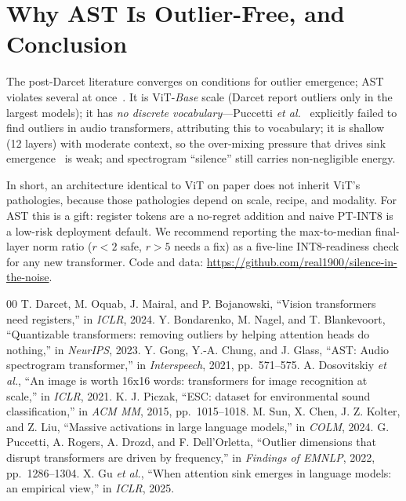 \documentclass[conference]{IEEEtran}
\begin{document}
\section{Why AST Is Outlier-Free, and Conclusion}
The post-Darcet literature converges on conditions for outlier emergence; AST violates several at once~\cite{darcet2024need,sun2024massive,puccetti2022outlier,gu2025emergence}. It is ViT-\emph{Base} scale (Darcet report outliers only in the largest models); it has \emph{no discrete vocabulary}---Puccetti \emph{et al.}~\cite{puccetti2022outlier} explicitly failed to find outliers in audio transformers, attributing this to vocabulary; it is shallow (12 layers) with moderate context, so the over-mixing pressure that drives sink emergence~\cite{gu2025emergence} is weak; and spectrogram ``silence'' still carries non-negligible energy.

In short, an architecture identical to ViT on paper does not inherit ViT's pathologies, because those pathologies depend on scale, recipe, and modality. For AST this is a gift: register tokens are a no-regret addition and naive PT-INT8 is a low-risk deployment default. We recommend reporting the max-to-median final-layer norm ratio ($r{<}2$ safe, $r{>}5$ needs a fix) as a five-line INT8-readiness check for any new transformer. Code and data: \url{https://github.com/real1900/silence-in-the-noise}.

\begin{thebibliography}{00}
 T. Darcet, M. Oquab, J. Mairal, and P. Bojanowski, ``Vision transformers need registers,'' in \emph{ICLR}, 2024.
 Y. Bondarenko, M. Nagel, and T. Blankevoort, ``Quantizable transformers: removing outliers by helping attention heads do nothing,'' in \emph{NeurIPS}, 2023.
 Y. Gong, Y.-A. Chung, and J. Glass, ``AST: Audio spectrogram transformer,'' in \emph{Interspeech}, 2021, pp.\ 571--575.
 A. Dosovitskiy \emph{et al.}, ``An image is worth 16x16 words: transformers for image recognition at scale,'' in \emph{ICLR}, 2021.
 K. J. Piczak, ``ESC: dataset for environmental sound classification,'' in \emph{ACM MM}, 2015, pp.\ 1015--1018.
 M. Sun, X. Chen, J. Z. Kolter, and Z. Liu, ``Massive activations in large language models,'' in \emph{COLM}, 2024.
 G. Puccetti, A. Rogers, A. Drozd, and F. Dell'Orletta, ``Outlier dimensions that disrupt transformers are driven by frequency,'' in \emph{Findings of EMNLP}, 2022, pp.\ 1286--1304.
 X. Gu \emph{et al.}, ``When attention sink emerges in language models: an empirical view,'' in \emph{ICLR}, 2025.
\end{thebibliography}
\end{document}
